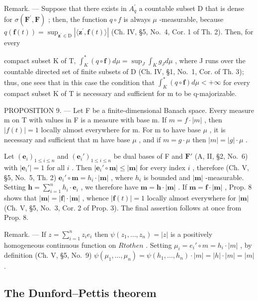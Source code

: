 Remark. --- Suppose that there exists in \(A_{q}^{\prime}\) a countable subset D that is dense for \(\sigma(\mathbf{F}^{\prime},\mathbf{F})\) ; then, the function \(q\circ f\) is always \(\mu\) -measurable, because \(q(\mathbf{f}(t)) = \sup_{\mathbf{z}^{\prime}\in\mathrm{D}} |\langle\mathbf{z}^{\prime},\mathbf{f}(t)\rangle|\) (Ch. IV, §5, No.~4, Cor. 1 of Th. 2). Then, for every

compact subset K of T, \(\int_{K}^{*}(q\circ\mathbf{f})d\mu=\sup_{J}\int_{K}g_{J}d\mu\) , where J runs over the countable directed set of finite subsets of D (Ch. IV, §1, No.~1, Cor. of Th. 3); thus, one sees that in this case the condition that \(\int_{K}^{*}(q\circ\mathbf{f})d\mu<+\infty\) for every compact subset K of T is necessary and sufficient for m to be q-majorizable.

PROPOSITION 9. --- Let F be a finite-dimensional Banach space. Every measure m on T with values in F is a measure with base \textbar m\textbar. If \(m = f \cdot |m|\) , then \(|f(t)| = 1\) locally almost everywhere for \textbar m\textbar. For m to have base \(\mu\) , it is necessary and sufficient that \textbar m\textbar{} have base \(\mu\) , and if \(m = g \cdot \mu\) then \(|m| = |g| \cdot \mu\) .

Let \((\mathbf{e}_i)_{1 \leqslant i \leqslant n}\) and \((\mathbf{e}_i')_{1 \leqslant i \leqslant n}\) be dual bases of F and \(\mathbf{F}'\) (A, II, §2, No.~6) with \(|\mathbf{e}_i'| = 1\) for all \(i\) . Then \(|\mathbf{e}_i' \circ \mathbf{m}| \leqslant |\mathbf{m}|\) for every index \(i\) , therefore (Ch. V, §5, No.~5, Th. 2) \(\mathbf{e}_i' \circ \mathbf{m} = h_i \cdot |\mathbf{m}|\) , where \(h_i\) is bounded and \(|\mathbf{m}|\) -measurable. Setting \(\mathbf{h} = \sum_{i=1}^{n} h_i \cdot \mathbf{e}_i\) , we therefore have \(\mathbf{m} = \mathbf{h} \cdot |\mathbf{m}|\) . If \(\mathbf{m} = \mathbf{f} \cdot |\mathbf{m}|\) , Prop. 8 shows that \(|\mathbf{m}| = |\mathbf{f}| \cdot |\mathbf{m}|\) , whence \(|\mathbf{f}(t)| = 1\) locally almost everywhere for \(|\mathbf{m}|\) (Ch. V, §5, No.~3, Cor. 2 of Prop. 3). The final assertion follows at once from Prop. 8.

Remark. --- If \(z = \sum_{i=1}^{n} z_i e_i\) then \(\psi(z_1, \ldots, z_n) = |z|\) is a positively homogeneous continuous function on \(R to the n\) . Setting \(\mu_i = e_i' \circ m = h_i \cdot |m|\) , by definition (Ch. V, §5, No.~9) \(\psi(\mu_1, \ldots, \mu_n) = \psi(h_1, \ldots, h_n) \cdot |m| = |h| \cdot |m| = |m|\) .

\subsection{The Dunford--Pettis theorem}

